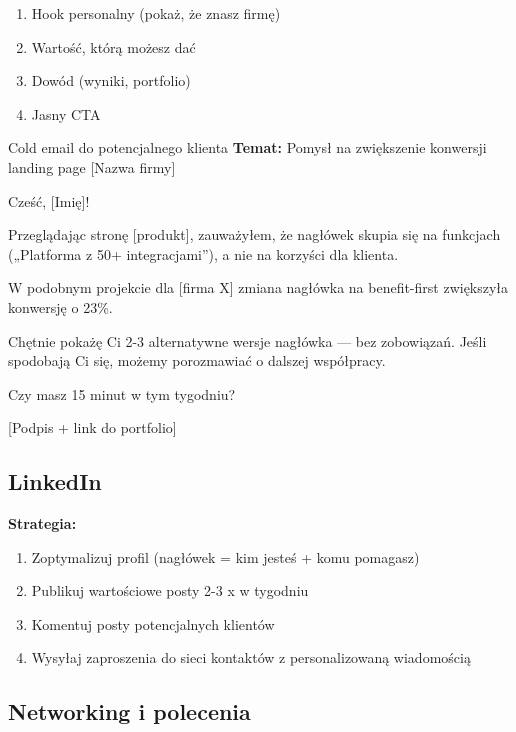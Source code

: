 \documentclass[
  12pt,
  a4paper,
  twoside,
  openright,
  12pt,
  DIV=12,
  BCOR=12mm]{scrbook}
\providecommand{\tightlist}{%
  \setlength{\itemsep}{0pt}\setlength{\parskip}{0pt}}\usepackage{longtable,booktabs,array}
\begin{document}
\begin{enumerate}
\def\labelenumi{\arabic{enumi}.}
\tightlist
\item
  Hook personalny (pokaż, że znasz firmę)
\item
  Wartość, którą możesz dać
\item
  Dowód (wyniki, portfolio)
\item
  Jasny CTA
\end{enumerate}

\begin{przyklad}{Cold email do potencjalnego klienta}
\textbf{Temat:} Pomysł na zwiększenie konwersji landing page [Nazwa firmy]

Cześć, [Imię]!

Przeglądając stronę [produkt], zauważyłem, że nagłówek skupia się na funkcjach („Platforma z 50+ integracjami”), a nie na korzyści dla klienta.

W podobnym projekcie dla [firma X] zmiana nagłówka na benefit-first zwiększyła konwersję o 23\%.

Chętnie pokażę Ci 2-3 alternatywne wersje nagłówka --- bez zobowiązań. Jeśli spodobają Ci się, możemy porozmawiać o dalszej współpracy.

Czy masz 15 minut w tym tygodniu?

[Podpis + link do portfolio]
\end{przyklad}

\subsection{LinkedIn}\label{linkedin-1}

\textbf{Strategia:}

\begin{enumerate}
\def\labelenumi{\arabic{enumi}.}
\tightlist
\item
  Zoptymalizuj profil (nagłówek = kim jesteś + komu pomagasz)
\item
  Publikuj wartościowe posty 2-3 x w tygodniu
\item
  Komentuj posty potencjalnych klientów
\item
  Wysyłaj zaproszenia do sieci kontaktów z personalizowaną wiadomością
\end{enumerate}

\subsection{Networking i polecenia}\label{networking-i-polecenia}
\end{document}
